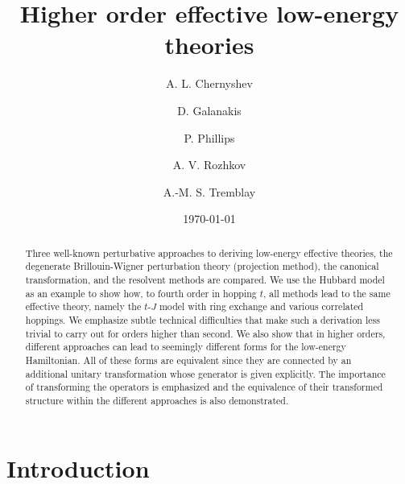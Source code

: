 \documentclass[floatfix,twocolumn,aps,prb,showpacs,superscriptaddress]{revtex4}
\begin{document}
\title{Higher order effective low-energy theories}
\author{A. L. Chernyshev}
\author{D. Galanakis}
\author{P. Phillips}
\author{A. V. Rozhkov}
\author{A.-M. S. Tremblay}
\date{\today }


\begin{abstract}
Three well-known perturbative approaches to deriving low-energy effective
theories, the degenerate Brillouin-Wigner perturbation theory (projection
method), the canonical transformation, and the resolvent methods are
compared. We use the Hubbard model as an example to show how, to fourth
order in hopping $t$, all methods lead to the same effective theory, namely
the $t$-$J$ model with ring exchange and various correlated hoppings. We
emphasize subtle technical difficulties that make such a derivation less
trivial to carry out for orders higher than second. We also show that in
higher orders, different approaches can lead to seemingly different forms for
the low-energy Hamiltonian. All of these forms are equivalent since they are
connected by an additional unitary transformation whose generator is given
explicitly. The importance of transforming the operators is emphasized and
the equivalence of their transformed structure within the different
approaches is also demonstrated.
\end{abstract}


\maketitle




\section{Introduction}
\end{document}

